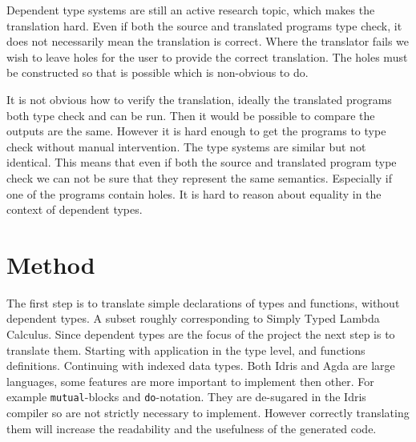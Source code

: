 \documentclass[parskip=half]{scrartcl}
\begin{document}


Dependent type systems are still an active research topic, which makes the
translation hard.
Even if both the source and translated programs type check, it does not
necessarily mean the translation is correct.  Where the translator fails we
wish to leave holes for the user to provide the correct translation. The holes
must be constructed so that is possible which is non-obvious to do.

It is not obvious how to verify the translation, ideally the translated
programs both type check and can be run. Then it would be possible to compare
the outputs are the same. However it is hard enough to get the programs to type
check without manual intervention. The type systems are similar but not
identical. This means that even if both the source and translated program
type check we can not be sure that they represent the same semantics.
Especially if one of the programs contain holes. It is hard to reason about
equality in the context of dependent types.


\section{Method}
The first step is to translate simple declarations of types and functions,
without dependent types. A subset roughly corresponding to Simply Typed Lambda
Calculus. Since dependent types are the focus of the project the next step is
to translate them. Starting with application in the type level, and functions
definitions. Continuing with indexed data types.
Both Idris and Agda are large languages, some features are more important to
implement then other.  For example \texttt{mutual}-blocks and
\texttt{do}-notation. They are de-sugared in the Idris compiler so are not
strictly necessary to implement. However correctly translating them will
increase the readability and the usefulness of the generated code.
\end{document}
